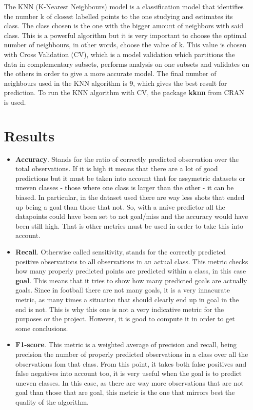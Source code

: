 \documentclass[]{article}
\begin{document}
The KNN (K-Nearest Neighbours) model is a classification model that
identifies the number k of closest labelled points to the one studying
and estimates its class. The class chosen is the one with the bigger
amount of neighbors with said class. This is a powerful algorithm but it
is very important to choose the optimal number of neighbours, in other
words, choose the value of k. This value is chosen with Cross Validation
(CV), which is a model validation which partitions the data in
complementary subsets, performs analysis on one subsets and validates on
the others in order to give a more accurate model. The final number of
neighbours used in the KNN algorithm is 9, which gives the best result
for prediction. To run the KNN algorithm with CV, the package
\textbf{kknn} from CRAN is used.

\hypertarget{results}{%
\section{Results}\label{results}}

\begin{itemize}
\item
  \textbf{Accuracy}. Stands for the ratio of correctly predicted
  observation over the total observations. If it is high it means that
  there are a lot of good predictions but it must be taken into account
  that for assymetric datasets or uneven classes - those where one class
  is larger than the other - it can be biased. In particular, in the
  dataset used there are way less shots that ended up being a goal than
  those that not. So, with a naive predictor all the datapoints could
  have been set to not goal/miss and the accuracy would have been still
  high. That is other metrics must be used in order to take this into
  account.
\item
  \textbf{Recall}. Otherwise called sensitivity, stands for the
  correctly predicted positive observations to all observations in an
  actual class. This metric checks how many properly predicted points
  are predicted within a class, in this case \textbf{goal}. This means
  that it tries to show how many predicted goals are actually goals.
  Since in football there are not many goals, it is a very innacurate
  metric, as many times a situation that should clearly end up in goal
  in the end is not. This is why this one is not a very indicative
  metric for the purposes or the project. However, it is good to compute
  it in order to get some conclusions.
\item
  \textbf{F1-score}. This metric is a weighted average of precision and
  recall, being precision the number of properly predicted observations
  in a class over all the observations fom that class. From this point,
  it takes both false positives and false negatives into account too, it
  is very useful when the goal is to predict uneven classes. In this
  case, as there are way more observations that are not goal than those
  that are goal, this metric is the one that mirrors best the quality of
  the algorithm.
\end{itemize}
\end{document}
